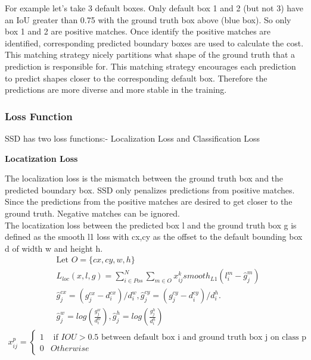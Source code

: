 \documentclass[12pt]{article}
\begin{document}
For example let's take 3 default boxes. Only default box 1 and 2 (but not 3) have an IoU greater than 0.75 with the ground truth box above (blue box). So only box 1 and 2 are positive matches. Once identify the positive matches are identified, corresponding predicted boundary boxes are used to calculate the cost. This matching strategy nicely partitions what shape of the ground truth that a prediction is responsible for. This matching strategy encourages each prediction to predict shapes closer to the corresponding default box. Therefore the predictions are more diverse and more stable in the training.





\subsubsection{Loss Function}
SSD has two loss functions:- Localization Loss and Classification Loss
\begin{flushleft}
\textbf{Locatization Loss}
\end{flushleft}
The localization loss is the mismatch between the ground truth box and the predicted boundary box. SSD only penalizes predictions from positive matches. Since the predictions from the positive matches are desired to get closer to the ground truth. Negative matches can be ignored.\\
The locatization loss between the predicted box l and the ground truth box g is defined as the smooth l1 loss with cx,cy as the offset to the default bounding box d of width w and height h.
\begin{align*}
    & \text{Let } O=\{cx,cy,w,h\} \\
    & L_{loc}(x,l,g)=\sum_{i\in Pos}^{N} \sum_{m\in O} x_{ij}^{k} smooth_{L1}(l_{i}^{m}-\hat{g}_{j}^{m})\\
    & \hat{g}_{j}^{cx}=(g_{j}^{cx}-d_{i}^{cx})/d_{i}^{w}, \hat{g}_{j}^{cy}=(g_{j}^{cy}-d_{i}^{cy})/d_{i}^{h}.\\
    & \hat{g}_{j}^{w}=log(\frac{g_{j}^{w}}{d_{i}^{w}}), 
    \hat{g}_{j}^{h}=log(\frac{g_{j}^{h}}{d_{i}^{h}})
\end{align*}
\begin{align*}
x_{ij}^{p}=
    \begin{cases}
    1 & \text{ if } IOU> 0.5 \text{ between default box i and ground truth box j on class p}\\
    0 & Otherwise
    \end{cases}
\end{align*}
\end{document}
